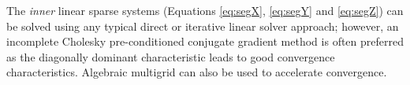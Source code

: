 \documentclass[sn-mathphys,Numbered]{sn-jnl}%
\begin{document}
The \emph{inner} linear sparse systems (Equations \ref{eq:segX}, \ref{eq:segY} and \ref{eq:segZ}) can be solved using any typical direct or iterative linear solver approach; however, an incomplete Cholesky pre-conditioned conjugate gradient method \cite{Jacobs1986} is often preferred as the diagonally dominant characteristic leads to good convergence characteristics.
Algebraic multigrid can also be used to accelerate convergence.
%
\end{document}
